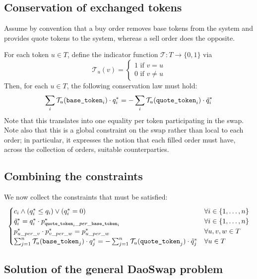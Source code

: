 \documentclass[11pt, reqno]{amsart}
\theoremstyle{definition}
\theoremstyle{remark}
\newcommand{\basetoken}{\textnormal{\texttt{base\_token}}}
\newcommand{\quotetoken}{\textnormal{\texttt{quote\_token}}}
\begin{document}
\subsection{Conservation of exchanged tokens}

Assume by convention that a buy order removes base tokens from the system and
provides quote tokens to the system, whereas a sell order does the opposite.

For each token $u \in T$, define the indicator function
$\mathcal{T}: T \to \{0, 1\}$ via
\[
	\mathcal{T}_u(v) =
	\begin{cases}
		1 \text{ if } v = u \\
		0 \text{ if } v \neq u
	\end{cases}
\]
Then, for each $u \in T$, the following conservation law must hold:
\[
	\sum_i \mathcal{T}_u(\basetoken_i) \cdot q^*_i
	=
	- \sum_i \mathcal{T}_u(\quotetoken_i) \cdot \tilde{q}_i^*
\]
Note that this translates into one equality per token participating in the
swap. Note also that this is a global constraint on the swap rather than local
to each order;
in particular, it expresses the notion that each filled order must have,
across the collection of orders, suitable counterparties.

\subsection{Combining the constraints}

We now collect the constraints that must be satisfied:
\begin{equation}
	\begin{cases}
		c_i \land (q_i^* \leq q_i) \lor (q_i^* = 0)
		 & \forall i \in \{1, \ldots, n\} \\
		\tilde{q}_i^* = q_i^* \cdot p_{\quotetoken_i\_per\_\basetoken_i}^*
		 & \forall i \in \{1, \ldots, n\} \\
		p^*_{u\_per\_v} \cdot p^*_{v\_per\_w} = p^*_{u\_per\_w}
		 & \forall u, v, w \in T          \\
		\sum_{j = 1}^n \mathcal{T}_u(\basetoken_j) \cdot q^*_j
		=
		- \sum_{j = 1}^n \mathcal{T}_u(\quotetoken_j) \cdot \tilde{q}_j^*
		 & \forall u \in T
	\end{cases}
\end{equation}

\subsection{Solution of the general DaoSwap problem}
\end{document}
